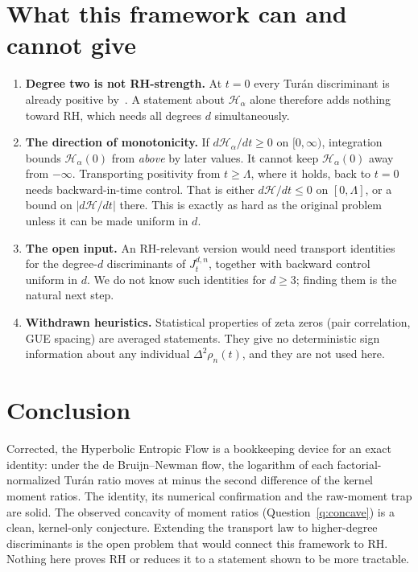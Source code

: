 \documentclass[11pt,a4paper]{article}
\theoremstyle{remark}
\begin{document}
\section{What this framework can and cannot give}\label{sec:scope}
\begin{enumerate}
\item \textbf{Degree two is not RH-strength.} At $t=0$ every Tur\'an
discriminant is already positive by~\cite{CNV1986}. A statement about
$\mathcal H_\alpha$ alone therefore adds nothing toward RH, which needs all
degrees $d$ simultaneously.
\item \textbf{The direction of monotonicity.} If
$d\mathcal H_\alpha/dt\ge0$ on $[0,\infty)$, integration bounds
$\mathcal H_\alpha(0)$ from \emph{above} by later values. It cannot keep
$\mathcal H_\alpha(0)$ away from $-\infty$. Transporting positivity from
$t\ge\Lambda$, where it holds, back to $t=0$ needs backward-in-time
control. That is either $d\mathcal H/dt\le0$ on $[0,\Lambda]$, or a bound
on $\lvert d\mathcal H/dt\rvert$ there. This is exactly as hard as the
original problem unless it can be made uniform in $d$.
\item \textbf{The open input.} An RH-relevant version would need transport
identities for the degree-$d$ discriminants of $J^{d,n}_t$, together with
backward control uniform in $d$. We do not know such identities for
$d\ge3$; finding them is the natural next step.
\item \textbf{Withdrawn heuristics.} Statistical properties of zeta zeros
(pair correlation, GUE spacing) are averaged statements. They give no
deterministic sign information about any individual
$\Delta^2\rho_n(t)$, and they are not used here.
\end{enumerate}

\section{Conclusion}
Corrected, the Hyperbolic Entropic Flow is a bookkeeping device for an exact
identity: under the de Bruijn--Newman flow, the logarithm of each
factorial-normalized Tur\'an ratio moves at minus the second difference of
the kernel moment ratios. The identity, its numerical confirmation and the
raw-moment trap are solid. The observed concavity of moment ratios
(Question~\ref{q:concave}) is a clean, kernel-only conjecture. Extending the
transport law to higher-degree discriminants is the open problem that would
connect this framework to RH. Nothing here proves RH or reduces it to a
statement shown to be more tractable.
\end{document}

